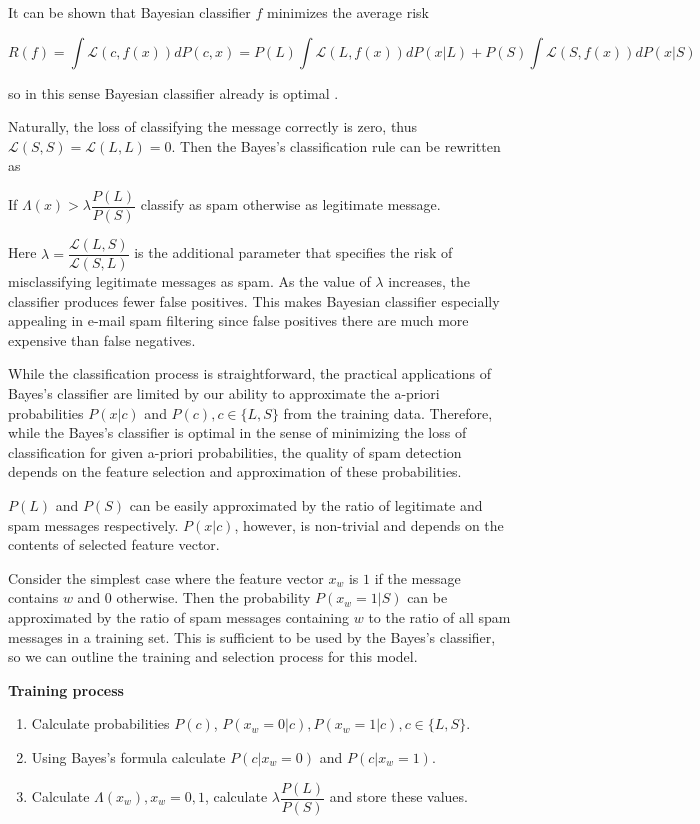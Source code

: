 \documentclass[12pt]{report}
\newcommand{\Loss}{\mathcal{L}}
\begin{document}
It can be shown that Bayesian classifier $f$ minimizes the average risk

$$R(f) = \int \Loss(c, f(x)) dP(c, x) = P(L) \int \Loss(L, f(x))dP(x | L) + P(S) \int \Loss(S, f(x))dP(x | S)$$

so in this sense Bayesian classifier already is optimal \cite{Tretyakov}.

Naturally, the loss of classifying the message correctly is zero, thus $\Loss(S, S) = \Loss(L, L) = 0$. Then the Bayes's classification rule can be rewritten as

\begin{center}
	If $\Lambda(x) > \lambda \dfrac{P(L)}{P(S)}$ classify as spam otherwise as legitimate message.
\end{center}

Here $\lambda = \dfrac{\Loss(L, S)}{\Loss(S, L)}$ is the additional parameter that specifies the risk of misclassifying legitimate messages as spam. As the value of $\lambda$ increases, the classifier produces fewer false positives. This makes Bayesian classifier especially appealing in e-mail spam filtering since false positives there are much more expensive than false negatives.

While the classification process is straightforward, the practical applications of Bayes's classifier are limited by our ability to approximate the a-priori probabilities $P(x | c)$ and $P(c), c \in \{L, S\}$ from the training data. Therefore, while the Bayes's classifier is optimal in the sense of minimizing the loss of classification for given a-priori probabilities, the quality of spam detection depends on the feature selection and approximation of these probabilities.

$P(L)$ and $P(S)$ can be easily approximated by the ratio of legitimate and spam messages respectively. $P(x | c)$, however, is non-trivial and depends on the contents of selected feature vector.

Consider the simplest case where the feature vector $x_w$ is $1$ if the message contains $w$ and $0$ otherwise. Then the probability $P(x_w = 1 | S)$ can be approximated by the ratio of spam messages containing $w$ to the ratio of all spam messages in a training set. This is sufficient to be used by the Bayes's classifier, so we can outline the training and selection process for this model.

\textbf{Training process}

\begin{enumerate}
	\item Calculate probabilities $P(c)$, $P(x_w = 0 | c), P(x_w = 1 | c), c \in \{L, S\}$.
	\item Using Bayes's formula calculate $P(c | x_w = 0)$ and $P(c | x_w = 1)$.
	\item Calculate $\Lambda(x_w), x_w = 0, 1$, calculate $\lambda \dfrac{P(L)}{P(S)}$ and store these values.
\end{enumerate}
\end{document}
